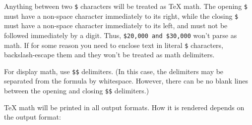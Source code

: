 \documentclass[
]{article}
\begin{document}
Anything between two \texttt{\$} characters will be treated as TeX math.
The opening \texttt{\$} must have a non-space character immediately to
its right, while the closing \texttt{\$} must have a non-space character
immediately to its left, and must not be followed immediately by a
digit. Thus, \texttt{\$20,000\ and\ \$30,000} won't parse as math. If
for some reason you need to enclose text in literal \texttt{\$}
characters, backslash-escape them and they won't be treated as math
delimiters.

For display math, use \texttt{\$\$} delimiters. (In this case, the
delimiters may be separated from the formula by whitespace. However,
there can be no blank lines between the opening and closing
\texttt{\$\$} delimiters.)

TeX math will be printed in all output formats. How it is rendered
depends on the output format:
\end{document}
